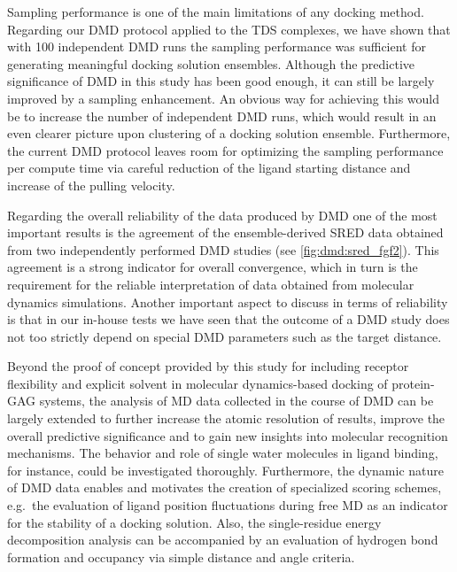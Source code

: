 Sampling performance is one of the main limitations of any docking method.
Regarding our DMD protocol applied to the TDS complexes, we have shown that with
100 independent DMD runs the sampling performance was sufficient for generating
meaningful docking solution ensembles. Although the predictive significance of
DMD in this study has been good enough, it can still be largely improved by a
sampling enhancement. An obvious way for achieving this would be to increase the
number of independent DMD runs, which would result in an even clearer picture
upon clustering of a docking solution ensemble. Furthermore, the current DMD
protocol leaves room for optimizing the sampling performance per compute time
via careful reduction of the ligand starting distance and increase of the
pulling velocity.

Regarding the overall reliability of the data produced by DMD one of the most
important results is the agreement of the ensemble-derived SRED data obtained
from two independently performed DMD studies (see \cref{fig:dmd:sred_fgf2}).
This agreement is a strong indicator for overall convergence, which in turn
is the requirement for the reliable interpretation of data obtained from
molecular dynamics simulations. Another important aspect to discuss in terms
of reliability is that in our in-house tests we have seen that the outcome
of a DMD study does not too strictly depend on special DMD parameters such as
the target distance.

Beyond the proof of concept provided by this study for including receptor
flexibility and explicit solvent in molecular dynamics-based docking of
protein-GAG systems, the analysis of MD data collected in the course of DMD can
be largely extended to further increase the atomic resolution of results,
improve the overall predictive significance and to gain new insights into
molecular recognition mechanisms. The behavior and role of single water
molecules in ligand binding, for instance, could be investigated thoroughly.
Furthermore, the dynamic nature of DMD data enables and motivates the creation
of specialized scoring schemes, e.g.\ the evaluation of ligand position
fluctuations during free MD as an indicator for the stability of a docking
solution. Also, the single-residue energy decomposition analysis can be
accompanied by an evaluation of hydrogen bond formation and occupancy via simple
distance and angle criteria.

